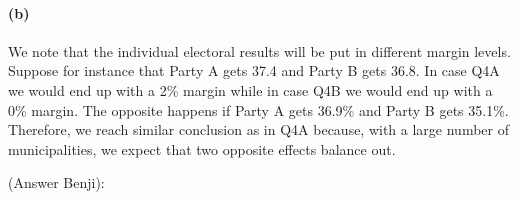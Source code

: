 \documentclass{scrartcl}
\begin{document}
\paragraph*{(b)}

We note that the individual electoral results will be put in different margin levels. Suppose for instance that Party A gets 37.4 and Party B gets 36.8. In case Q4A we would end up with a 2\% margin while in case Q4B we would end up with a 0\% margin. The opposite happens if Party A gets 36.9\% and Party B gets 35.1\%. \\

Therefore, we reach similar conclusion as in Q4A because, with a large number of municipalities, we expect that two opposite effects balance out.


(Answer Benji): 
\end{document}
